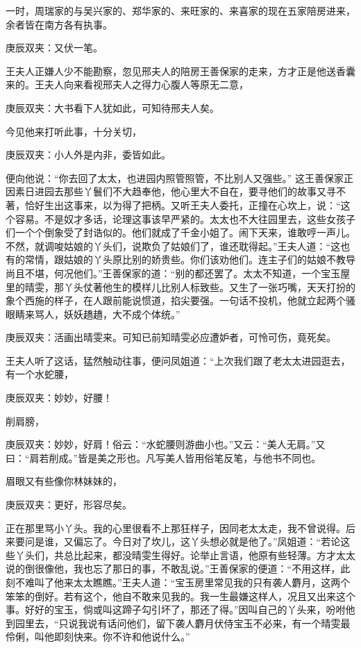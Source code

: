 \begin{parag}
    一时，周瑞家的与吴兴家的、郑华家的、来旺家的、来喜家的现在五家陪房进来，余者皆在南方各有执事。\begin{note}庚辰双夹：又伏一笔。\end{note}王夫人正嫌人少不能勘察，忽见邢夫人的陪房王善保家的走来，方才正是他送香囊来的。王夫人向来看视邢夫人之得力心腹人等原无二意，\begin{note}庚辰双夹：大书看下人犹如此，可知待邢夫人矣。\end{note}今见他来打听此事，十分关切，\begin{note}庚辰双夹：小人外是内非，委皆如此。\end{note}便向他说：“你去回了太太，也进园内照管照管，不比别人又强些。” 这王善保家正因素日进园去那些丫鬟们不大趋奉他，他心里大不自在，要寻他们的故事又寻不著，恰好生出这事来，以为得了把柄。又听王夫人委托，正撞在心坎上，说：“这个容易。不是奴才多话，论理这事该早严紧的。太太也不大往园里去，这些女孩子们一个个倒象受了封诰似的。他们就成了千金小姐了。闹下天来，谁敢哼一声儿。不然，就调唆姑娘的丫头们，说欺负了姑娘们了，谁还耽得起。”王夫人道：“这也有的常情，跟姑娘的丫头原比别的娇贵些。你们该劝他们。连主子们的姑娘不教导尚且不堪，何况他们。”王善保家的道：“别的都还罢了。太太不知道，一个宝玉屋里的晴雯，那丫头仗著他生的模样儿比别人标致些。又生了一张巧嘴，天天打扮的象个西施的样子，在人跟前能说惯道，掐尖要强。一句话不投机，他就立起两个骚眼睛来骂人，妖妖趫趫，大不成个体统。”\begin{note}庚辰双夹：活画出晴雯来。可知已前知晴雯必应遭妒者，可怜可伤，竟死矣。\end{note}王夫人听了这话，猛然触动往事，便问凤姐道：“上次我们跟了老太太进园逛去，有一个水蛇腰，\begin{note}庚辰双夹：妙妙，好腰！\end{note}削肩膀，\begin{note}庚辰双夹：妙妙，好肩！俗云：“水蛇腰则游曲小也。”又云：“美人无肩。”又曰：“肩若削成。”皆是美之形也。凡写美人皆用俗笔反笔，与他书不同也。\end{note}眉眼又有些像你林妹妹的，\begin{note}庚辰双夹：更好，形容尽矣。\end{note}正在那里骂小丫头。我的心里很看不上那狂样子，因同老太太走，我不曾说得。后来要问是谁，又偏忘了。今日对了坎儿，这丫头想必就是他了。”凤姐道：“若论这些丫头们，共总比起来，都没晴雯生得好。论举止言语，他原有些轻薄。方才太太说的倒很像他，我也忘了那日的事，不敢乱说。”王善保家的便道：“不用这样，此刻不难叫了他来太太瞧瞧。”王夫人道：“宝玉房里常见我的只有袭人麝月，这两个笨笨的倒好。若有这个，他自不敢来见我的。我一生最嫌这样人，况且又出来这个事。好好的宝玉，倘或叫这蹄子勾引坏了，那还了得。”因叫自己的丫头来，吩咐他到园里去，“只说我说有话问他们，留下袭人麝月伏侍宝玉不必来，有一个晴雯最伶俐，叫他即刻快来。你不许和他说什么。”
\end{parag}


